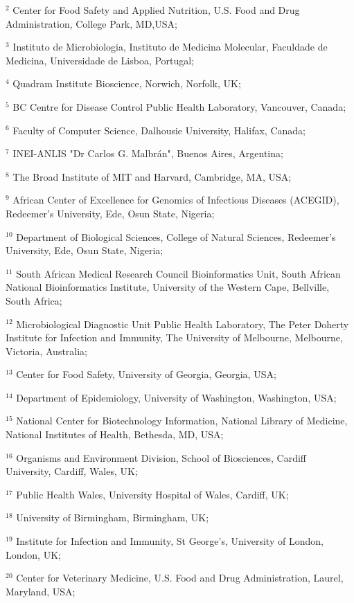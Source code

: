 $^2$ Center for Food Safety and Applied Nutrition, U.S. Food and Drug Administration, College Park, MD,USA; 

$^3$ Instituto de Microbiologia, Instituto de Medicina Molecular, Faculdade de Medicina, Universidade de Lisboa, Portugal;

$^4$ Quadram Institute Bioscience, Norwich, Norfolk, UK;

$^5$ BC Centre for Disease Control Public Health Laboratory, Vancouver, Canada;

$^6$ Faculty of Computer Science, Dalhousie University, Halifax, Canada;

$^7$ INEI-ANLIS "Dr Carlos G. Malbrán", Buenos Aires, Argentina;

$^8$ The Broad Institute of MIT and Harvard, Cambridge, MA, USA;

$^9$ African Center of Excellence for Genomics of Infectious Diseases (ACEGID), Redeemer's University, Ede, Osun State, Nigeria;

$^{10}$ Department of Biological Sciences, College of Natural Sciences, Redeemer's University, Ede, Osun State, Nigeria;

$^{11}$ South African Medical Research Council Bioinformatics Unit, South African National Bioinformatics Institute, University of the Western Cape, Bellville, South Africa;

$^{12}$  Microbiological Diagnostic Unit Public Health Laboratory, The Peter Doherty Institute for Infection and Immunity, The University of Melbourne, Melbourne, Victoria, Australia;

$^{13}$ Center for Food Safety, University of Georgia, Georgia, USA;

$^{14}$ Department of Epidemiology, University of Washington, Washington, USA;

$^{15}$ National Center for Biotechnology Information, National Library of Medicine, National Institutes of Health, Bethesda, MD, USA;

$^{16}$ Organisms and Environment Division, School of Biosciences, Cardiff University, Cardiff, Wales, UK;

$^{17}$ Public Health Wales, University Hospital of Wales, Cardiff, UK;

$^{18}$ University of Birmingham, Birmingham, UK;

$^{19}$ Institute for Infection and Immunity, St George’s, University of London, London, UK;

$^{20}$ Center for Veterinary Medicine, U.S. Food and Drug Administration, Laurel, Maryland, USA;

